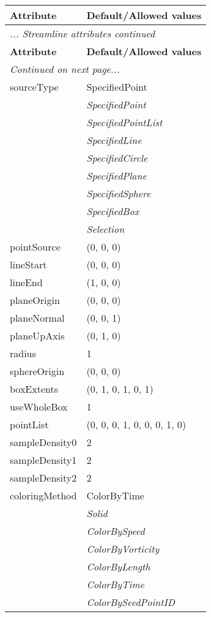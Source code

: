 \documentclass[10pt,a4paper]{report}
\begin{document}
\begin{longtable}{ll}
{\bf Attribute} & {\bf Default/Allowed values} \\
\hline \hline
\endfirsthead
\multicolumn{2}{l}{{\it ... Streamline attributes continued}} \\
{\bf Attribute} & {\bf Default/Allowed values} \\
\hline \hline
\endhead
\hline
\multicolumn{2}{l}{{\it Continued on next page...}} \\
\endfoot
\hline
\endlastfoot

sourceType  &  SpecifiedPoint   \\
 & {\it  SpecifiedPoint} \\
 & {\it  SpecifiedPointList} \\
 & {\it  SpecifiedLine} \\
 & {\it  SpecifiedCircle} \\
 & {\it  SpecifiedPlane} \\
 & {\it  SpecifiedSphere} \\
 & {\it  SpecifiedBox} \\
 & {\it  Selection} \\
pointSource  &  (0, 0, 0) \\
lineStart  &  (0, 0, 0) \\
lineEnd  &  (1, 0, 0) \\
planeOrigin  &  (0, 0, 0) \\
planeNormal  &  (0, 0, 1) \\
planeUpAxis  &  (0, 1, 0) \\
radius  &  1 \\
sphereOrigin  &  (0, 0, 0) \\
boxExtents  &  (0, 1, 0, 1, 0, 1) \\
useWholeBox  &  1 \\
pointList  &  (0, 0, 0, 1, 0, 0, 0, 1, 0) \\
sampleDensity0  &  2 \\
sampleDensity1  &  2 \\
sampleDensity2  &  2 \\
coloringMethod  &  ColorByTime   \\
 & {\it  Solid} \\
 & {\it  ColorBySpeed} \\
 & {\it  ColorByVorticity} \\
 & {\it  ColorByLength} \\
 & {\it  ColorByTime} \\
 & {\it  ColorBySeedPointID} \\

\end{longtable}
\end{document}
